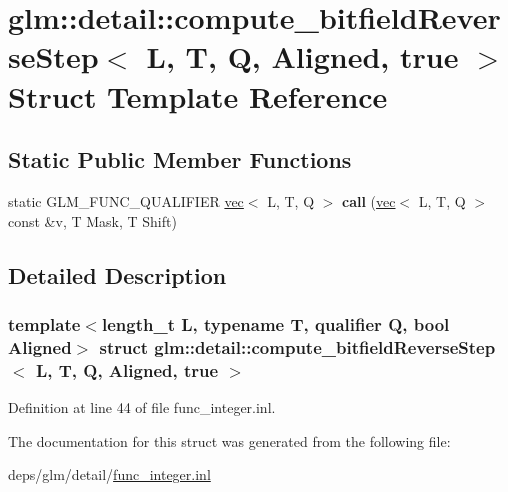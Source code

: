 \hypertarget{structglm_1_1detail_1_1compute__bitfieldReverseStep_3_01L_00_01T_00_01Q_00_01Aligned_00_01true_01_4}{}\section{glm\+:\+:detail\+:\+:compute\+\_\+bitfield\+Reverse\+Step$<$ L, T, Q, Aligned, true $>$ Struct Template Reference}
\label{structglm_1_1detail_1_1compute__bitfieldReverseStep_3_01L_00_01T_00_01Q_00_01Aligned_00_01true_01_4}
\subsection*{Static Public Member Functions}
\begin{DoxyCompactItemize}
\item 
\mbox{\label{structglm_1_1detail_1_1compute__bitfieldReverseStep_3_01L_00_01T_00_01Q_00_01Aligned_00_01true_01_4_aaa8d086197cfcab7e6e5b5fdb10224b9}} 
static G\+L\+M\+\_\+\+F\+U\+N\+C\+\_\+\+Q\+U\+A\+L\+I\+F\+I\+ER \hyperlink{structglm_1_1vec}{vec}$<$ L, T, Q $>$ {\bfseries call} (\hyperlink{structglm_1_1vec}{vec}$<$ L, T, Q $>$ const \&v, T Mask, T Shift)
\end{DoxyCompactItemize}


\subsection{Detailed Description}
\subsubsection*{template$<$length\+\_\+t L, typename T, qualifier Q, bool Aligned$>$\newline
struct glm\+::detail\+::compute\+\_\+bitfield\+Reverse\+Step$<$ L, T, Q, Aligned, true $>$}



Definition at line 44 of file func\+\_\+integer.\+inl.



The documentation for this struct was generated from the following file\+:\begin{DoxyCompactItemize}
\item 
deps/glm/detail/\hyperlink{func__integer_8inl}{func\+\_\+integer.\+inl}\end{DoxyCompactItemize}
